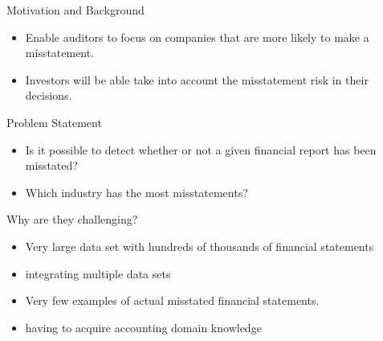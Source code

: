 \documentclass[final]{beamer}
\newlength{\sepwid}
\newlength{\onecolwid}
\begin{document}
\begin{frame}[t] %

\begin{columns}[t] %

\begin{column}{\sepwid}\end{column} %

\begin{column}{\onecolwid} %

\begin{block}{Motivation and Background} 
\begin{itemize}
\item Enable auditors to focus on companies that are more likely to make a misstatement. 
\item Investors will be able take into account the misstatement risk in their decisions. 
\end{itemize}
\end{block}

\begin{alertblock}{Problem Statement} 
\begin{itemize}
\item Is it possible to detect whether or not a given financial report has been misstated?
\item Which industry has the most misstatements?

\end{itemize}

Why are they challenging?\\
\begin{itemize}
\item Very large data set with hundreds of thousands of financial statements
\item integrating multiple data sets
\item Very few examples of actual misstated financial statements. 
\item having to acquire accounting domain knowledge
\end{itemize}
\end{alertblock}


\end{column}
\end{columns}
\end{frame}
\end{document}
